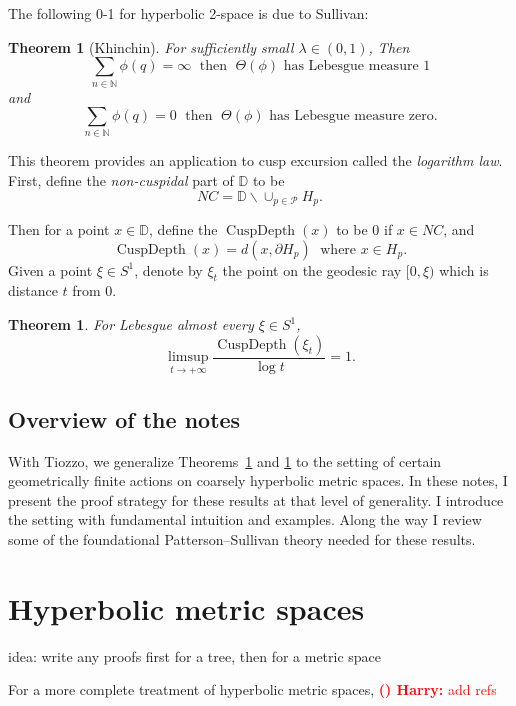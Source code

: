 \documentclass[11pt]{amsart}
\theoremstyle{plain}
\newtheorem{theorem}[proposition]{Theorem}
\theoremstyle{definition}
\theoremstyle{remark}
\DeclareMathOperator{\cuspdepth}{CuspDepth}
\newcounter{countharry}
\newcommand{\comharry}[1]{{\textcolor{red}{\textrm{{\bf (\arabic{countharry})\stepcounter{countharry} Harry:} #1}}}}
\begin{document}
The following 0-1 for hyperbolic 2-space is due to Sullivan:

\begin{theorem}[Khinchin]
  For sufficiently small $\lambda\in (0,1)$, 
  Then 
  \[
    \sum_{n\in\mathbb N} \phi(q)=\infty \; \text{ then }\; \Theta(\phi)
    \text{ has Lebesgue measure 1}
  \]
  and 
  \[
    \sum_{n\in\mathbb N} \phi(q)=0 \; \text{ then }\; \Theta(\phi)
    \text{ has Lebesgue measure zero}.
  \]
  \label{thm:khinchin_type}
\end{theorem}

This theorem provides an application to cusp excursion called the {\em logarithm
law}. First, define the {\em non-cuspidal} part of $\mathbb D$ to be 
\[
  NC=\mathbb D \smallsetminus \cup_{p\in\mathcal P} H_p.
\]

Then for a point $x\in \mathbb D$, define the $\cuspdepth(x)$
to be 0 if $x\in NC$, and 
\[
  \cuspdepth(x)=d(x,\partial H_p) \; \text{ where } x\in H_p.
\]
Given a point $\xi\in S^1$, denote by $\xi_t$ the point on the geodesic ray
$[0,\xi)$ which is distance $t$ from $0$. 

\begin{theorem}
  For Lebesgue almost every $\xi\in S^1$, 
  \[
    \limsup_{t\to+\infty} \frac{\cuspdepth(\xi_t)}{\log t}=1.
  \]
  \label{thm:loglaw}
\end{theorem}


\subsection{Overview of the notes}

With Tiozzo, we generalize Theorems~\ref{thm:khinchin_type} and
\ref{thm:loglaw} to the setting of certain geometrically finite actions on
coarsely hyperbolic metric spaces.  In these notes, I present the proof
strategy for these results at that level of generality. I introduce the
setting with fundamental intuition and examples. Along the way I review
some of the foundational Patterson--Sullivan theory needed for these
results. 

\section{Hyperbolic metric spaces}

{\color{red} idea: write any proofs first for a tree, then for a metric
space}

For a more complete treatment of hyperbolic metric spaces,
\comharry{add refs} 
\end{document}
